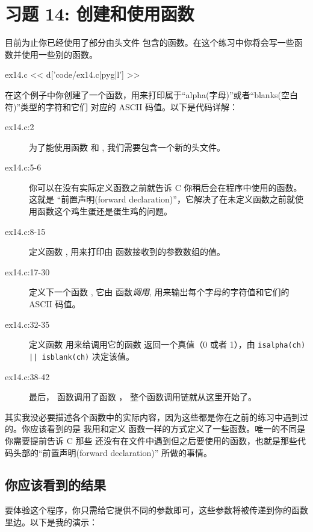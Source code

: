 \chapter{习题 14: 创建和使用函数}

目前为止你已经使用了部分由头文件  包含的函数。在这个练习中你将会写一些函数并使用一些别的函数。

\begin{code}{ex14.c}
<< d['code/ex14.c|pyg|l'] >>
\end{code}

在这个例子中你创建了一个函数，用来打印属于“alpha(字母)”或者“blanks(空白符)”类型的字符和它们
对应的 ASCII 码值。以下是代码详解：

\begin{description}
\item[ex14.c:2] 为了能使用函数  和 , 我们需要包含一个新的头文件。
\item[ex14.c:5-6] 你可以在没有实际定义函数之前就告诉 C 你稍后会在程序中使用的函数。这就是
    “前置声明(forward declaration)”，它解决了在未定义函数之前就使用函数这个鸡生蛋还是蛋生鸡的问题。
\item[ex14.c:8-15] 定义函数 , 用来打印由  函数接收到的参数数组的值。
\item[ex14.c:17-30] 定义下一个函数 , 它由  
    函数\emph{调用}, 用来输出每个字母的字符值和它们的 ASCII 码值。
\item[ex14.c:32-35] 定义函数  用来给调用它的函数  返回一个真值（0 或者 1），由 \verb,isalpha(ch) || isblank(ch), 决定该值。
\item[ex14.c:38-42] 最后， 函数调用了函数 ，
    整个函数调用链就从这里开始了。
\end{description}

其实我没必要描述各个函数中的实际内容，因为这些都是你在之前的练习中遇到过的。你应该看到的是
我用和定义  函数一样的方式定义了一些函数。唯一的不同是你需要提前告诉 C 那些
还没有在文件中遇到但之后要使用的函数，也就是那些代码头部的“前置声明(forward declaration)”
所做的事情。

\section{你应该看到的结果}

要体验这个程序，你只需给它提供不同的参数即可，这些参数将被传递到你的函数里边。以下是我的演示：

